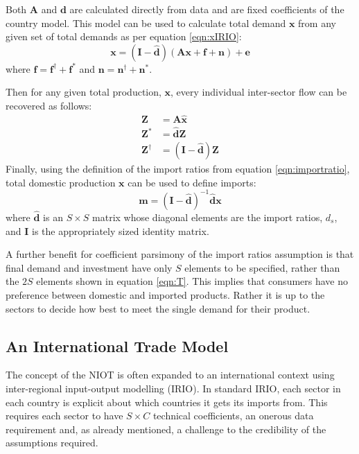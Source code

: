 \documentclass[a4paper]{article}
\begin{document}
Both $\boldsymbol{A}$ and $\boldsymbol{d}$ are calculated directly from data and are fixed coefficients of the country model. This model can be used to calculate total demand $\boldsymbol{x}$ from any given set of total demands as per equation \eqref{eqn:xIRIO}:
\begin{equation}
\boldsymbol{x} 
= 
(\boldsymbol{I} - \boldsymbol{\hat{d}})
(
\boldsymbol{Ax} + 
\boldsymbol{f} + \boldsymbol{n}
)
+ \boldsymbol{e}
\label{eqn:xmodel}
\end{equation}
where $\boldsymbol{f} = \boldsymbol{f}^{\dagger} + \boldsymbol{f}^{*}$ and $\boldsymbol{n} = \boldsymbol{n}^{\dagger} + \boldsymbol{n}^{*}$.
 
Then for any given total production, $\boldsymbol{x}$, every individual inter-sector flow can be recovered as follows:
\begin{align}
\boldsymbol{Z}& = \boldsymbol{A}\boldsymbol{\hat{x}}\nonumber\\
\boldsymbol{Z^*}& = \boldsymbol{\hat{d}}\boldsymbol{Z}\\
\boldsymbol{Z^\dagger}& = (\boldsymbol{I} - \boldsymbol{\hat{d}})
	\boldsymbol{Z}\label{eqn:zstar}
\end{align}
Finally, using the definition of the import ratios from equation \eqref{eqn:importratio}, total domestic production $\boldsymbol{x}$ can be used to define imports:
\begin{equation}
\boldsymbol{m} = 
(\boldsymbol{I} - 
\boldsymbol{\hat{d}})^{-1} 
\boldsymbol{\hat{d}}\boldsymbol{x}\label{eqn:mmodel}
\end{equation}
where $\boldsymbol{\hat{d}}$ is an $S \times S$ matrix whose diagonal elements are the import ratios, $d_s$, and $\boldsymbol{I}$ is the appropriately sized identity matrix.

A further benefit for coefficient parsimony of the import ratios assumption is that final demand and investment have only $S$ elements to be specified, rather than the $2S$ elements shown in equation \eqref{eqn:T}.
This implies that consumers have no preference between domestic and imported products.
Rather it is up to the sectors to decide how best to meet the single demand for their product.

\subsection{An International Trade Model}\label{sec:trade}
The concept of the NIOT is often expanded to an international context using inter-regional input-output modelling (IRIO). In standard IRIO, each sector in each country is explicit about which countries it gets its imports from. 
This requires each sector to have $S \times C$ technical coefficients, an onerous data requirement and, as already mentioned, a challenge to the credibility of the assumptions required. 
\end{document}
